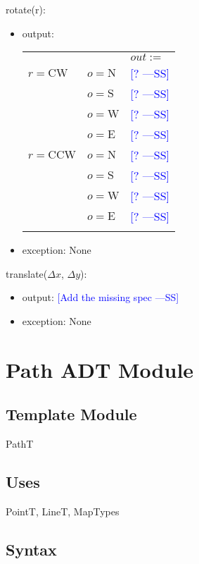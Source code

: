 \documentclass[12pt]{article}
\newcommand{\authornote}[3]{\textcolor{#1}{[#3 ---#2]}}
\newcommand{\authornote}[3]{}
\newcommand{\wss}[1]{\authornote{blue}{SS}{#1}}
\begin{document}
\noindent rotate(r):
\begin{itemize}
\item output: 
\begin{tabular}{|p{}|p{2.3cm}|l|}
\hhline{~|~|-|}
\multicolumn{1}{r}{} & \multicolumn{1}{r|}{} & \multicolumn{1}{l|}{$out :=$}\\
\hhline{|-|-|-|}
$r = \mbox{CW}$ & $o = \mbox{N}$ & \wss{?}\\
\hhline{|~|-|-|}
~ & $o = \mbox{S}$ & \wss{?}\\
\hhline{|~|-|-|}
~ & $o = \mbox{W}$ & \wss{?}\\
\hhline{|~|-|-|}
~ & $o = \mbox{E}$ & \wss{?}\\
\hhline{-|-|-|}
$r = \mbox{CCW}$ & $o = \mbox{N}$ & \wss{?}\\
\hhline{|~|-|-|}
~ & $o = \mbox{S}$ & \wss{?}\\
\hhline{|~|-|-|}
~ & $o = \mbox{W}$ & \wss{?}\\
\hhline{|~|-|-|}
~ & $o = \mbox{E}$ & \wss{?}\\
\hhline{-|-|-|}
\end{tabular}

\item exception: None
\end{itemize}

\noindent translate($\Delta x$, $\Delta y$):
\begin{itemize}
\item output: \wss{Add the missing spec}
\item exception: None
\end{itemize}

\newpage

\section* {Path ADT Module}

\subsection*{Template Module}

PathT

\subsection* {Uses}

PointT, LineT, MapTypes

\subsection* {Syntax}
\end{document}
